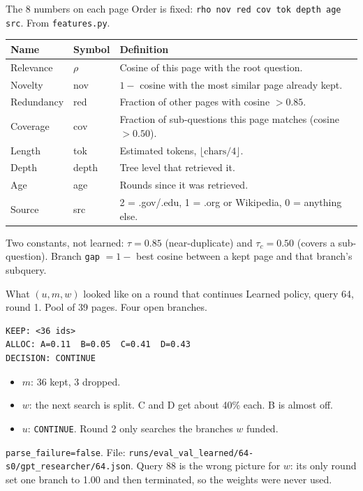 \documentclass[aspectratio=169,11pt]{beamer}
\begin{document}
\begin{frame}{The 8 numbers on each page}
  \small
  Order is fixed: \texttt{rho nov red cov tok depth age src}. From \texttt{features.py}.
  \vspace{0.2em}
  \begin{tabular}{llp{6.4cm}}
    \hline
    Name & Symbol & Definition \\
    \hline
    Relevance & $\rho$ & Cosine of this page with the root question. \\
    Novelty & nov & $1 -$ cosine with the most similar page already kept. \\
    Redundancy & red & Fraction of other pages with cosine $> 0.85$. \\
    Coverage & cov & Fraction of sub-questions this page matches (cosine $> 0.50$). \\
    Length & tok & Estimated tokens, $\lfloor \mathrm{chars}/4 \rfloor$. \\
    Depth & depth & Tree level that retrieved it. \\
    Age & age & Rounds since it was retrieved. \\
    Source & src & 2 = .gov/.edu, 1 = .org or Wikipedia, 0 = anything else. \\
    \hline
  \end{tabular}
  \vspace{0.3em}
  Two constants, not learned: $\tau = 0.85$ (near-duplicate) and $\tau_c = 0.50$ (covers a sub-question). Branch \texttt{gap} $= 1 - $ best cosine between a kept page and that branch's subquery.
\end{frame}

\begin{frame}[fragile]{What $(u,m,w)$ looked like on a round that continues}
  Learned policy, query 64, round 1. Pool of 39 pages. Four open branches.
  \vspace{0.2em}
  \begin{verbatim}
KEEP: <36 ids>
ALLOC: A=0.11  B=0.05  C=0.41  D=0.43
DECISION: CONTINUE
  \end{verbatim}
  \vspace{0.2em}
  \begin{itemize}
    \item $m$: 36 kept, 3 dropped.
    \item $w$: the next search is split. C and D get about 40\% each. B is almost off.
    \item $u$: \texttt{CONTINUE}. Round 2 only searches the branches $w$ funded.
  \end{itemize}
  \vspace{0.15em}
  {\small \texttt{parse\_failure=false}. File: \texttt{runs/eval\_val\_learned/64-s0/gpt\_researcher/64.json}. Query 88 is the wrong picture for $w$: its only round set one branch to 1.00 and then terminated, so the weights were never used.}
\end{frame}
\end{document}
